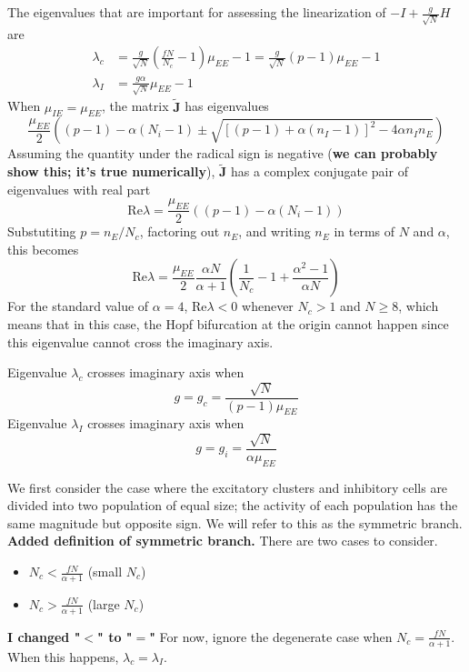 \documentclass[11pt,reqno]{amsart}
\newcommand{\Jvec}{\mathbf{J}}
\begin{document}
The eigenvalues that are important for assessing the linearization of $-I + \frac{g}{\sqrt{N}} H$ are
\begin{align*}
    \lambda_c &= \frac{g}{\sqrt{N}} \left( \frac{f N}{N_c} - 1  \right)\mu_{EE} - 1 = \frac{g}{\sqrt{N}} \left( p - 1  \right) \mu_{EE} - 1  \\
    \lambda_I &= \frac{g\alpha}{\sqrt{N}} \mu_{EE} - 1
\end{align*}
When $\mu_{IE} = \mu_{EE}$, the matrix $\tilde{\Jvec}$ has eigenvalues
\[
\frac{\mu_{EE}}{2}\left( (p-1) - \alpha(N_i - 1) \pm \sqrt{ \left[ (p-1) +  \alpha(n_I - 1) \right]^2 - 4 \alpha n_I n_E} \right)
\]
Assuming the quantity under the radical sign is negative (\textbf{we can probably show this; it's true numerically}), $\tilde{\Jvec}$ has a complex conjugate pair of eigenvalues with real part
\[
\text{Re} \lambda = \frac{\mu_{EE}}{2}\left( (p-1) - \alpha(N_i - 1) \right)
\]
Substutiting $p = n_E/N_c$, factoring out $n_E$, and writing $n_E$ in terms of $N$ and $\alpha$, this becomes 
\[
\text{Re} \lambda = \frac{\mu_{EE}}{2}
\frac{\alpha N}{\alpha + 1}
\left( \frac{1}{N_c} - 1 + \frac{\alpha^2-1}{\alpha N} \right)
\]
For the standard value of $\alpha = 4$, $\text{Re} \lambda < 0$ whenever $N_c > 1$ and $N \geq 8$, which means that in this case, the Hopf bifurcation at the origin cannot happen since this eigenvalue cannot cross the imaginary axis.



Eigenvalue $\lambda_c$ crosses imaginary axis when 
\[
g = g_c = \frac{\sqrt{N}}{(p-1)\mu_{EE}}
\]
Eigenvalue $\lambda_I$ crosses imaginary axis when
\[
g = g_i = \frac{\sqrt{N}}{\alpha \mu_{EE}}
\]

We first consider the case where the excitatory clusters and inhibitory cells are divided into two population of equal size; the activity of each population has the same magnitude but opposite sign. We will refer to this as the symmetric branch. \textbf{Added definition of symmetric branch.} There are two cases to consider.
\begin{itemize}
    \item $N_c < \frac{fN}{\alpha+1}$ (small $N_c$)
    \item $N_c > \frac{fN}{\alpha+1}$ (large $N_c$)
\end{itemize}
\textbf{I changed "$<$" to "$=$" }
For now, ignore the degenerate case when $N_c = \frac{fN}{\alpha+1}$. When this happens, $\lambda_c = \lambda_I$.
\end{document}
